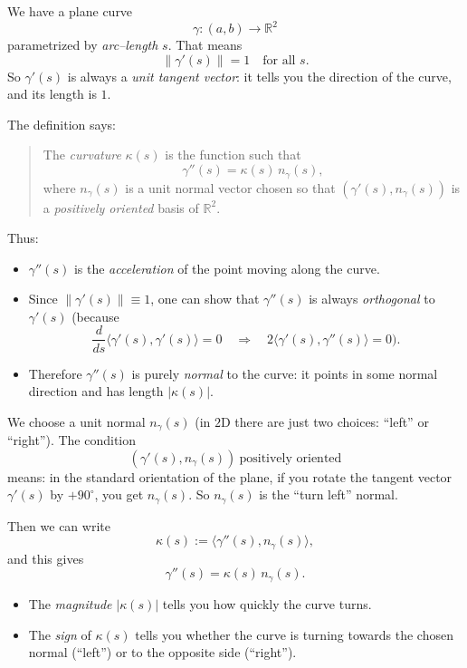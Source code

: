 \documentclass[12pt,a4paper]{article}
\theoremstyle{plain}
\theoremstyle{definition}      %
\begin{document}
	We have a plane curve
	\[
	\gamma:(a,b)\to\mathbb{R}^2
	\]
	parametrized by \emph{arc--length} $s$.  That means
	\[
	\|\gamma'(s)\| = 1 \quad\text{for all } s.
	\]
	So $\gamma'(s)$ is always a \emph{unit tangent vector}: it tells you the
	direction of the curve, and its length is $1$.
	
	The definition says:
	
	\begin{quote}
		The \emph{curvature} $\kappa(s)$ is the function such that
		\[
		\gamma''(s) = \kappa(s)\,n_\gamma(s),
		\]
		where $n_\gamma(s)$ is a unit normal vector chosen so that
		$(\gamma'(s),n_\gamma(s))$ is a \emph{positively oriented} basis of
		$\mathbb{R}^2$.
	\end{quote}
	
	Thus:
	\begin{itemize}
		\item $\gamma''(s)$ is the \emph{acceleration} of the point moving along the
		curve.
		\item Since $\|\gamma'(s)\|\equiv 1$, one can show that
		$\gamma''(s)$ is always \emph{orthogonal} to $\gamma'(s)$ (because
		\[
		\frac{d}{ds}\langle \gamma'(s),\gamma'(s)\rangle = 0
		\quad\Rightarrow\quad
		2\langle \gamma'(s),\gamma''(s)\rangle = 0).
		\]
		\item Therefore $\gamma''(s)$ is purely \emph{normal} to the curve: it points
		in some normal direction and has length $|\kappa(s)|$.
	\end{itemize}
	
	We choose a unit normal $n_\gamma(s)$ (in $2$D there are just two choices:
	``left'' or ``right'').  The condition
	\[
	(\gamma'(s),n_\gamma(s))\ \text{positively oriented}
	\]
	means: in the standard orientation of the plane, if you rotate the tangent
	vector $\gamma'(s)$ by $+90^\circ$, you get $n_\gamma(s)$.  So $n_\gamma(s)$ is
	the ``turn left'' normal.
	
	Then we can write
	\[
	\kappa(s) := \langle \gamma''(s), n_\gamma(s)\rangle,
	\]
	and this gives
	\[
	\gamma''(s) = \kappa(s)\,n_\gamma(s).
	\]
	
	\begin{itemize}
		\item The \emph{magnitude} $|\kappa(s)|$ tells you how quickly the curve
		turns.
		\item The \emph{sign} of $\kappa(s)$ tells you whether the curve is turning
		towards the chosen normal (``left'') or to the opposite side (``right'').
	\end{itemize}
	
\end{document}
